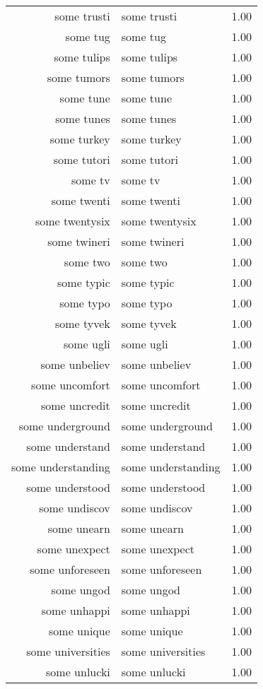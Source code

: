 \begin{table}[ht]
\begin{tabular}{rlr}
  some trusti & some trusti & 1.00 \\ 
  some tug & some tug & 1.00 \\ 
  some tulips & some tulips & 1.00 \\ 
  some tumors & some tumors & 1.00 \\ 
  some tune & some tune & 1.00 \\ 
  some tunes & some tunes & 1.00 \\ 
  some turkey & some turkey & 1.00 \\ 
  some tutori & some tutori & 1.00 \\ 
  some tv & some tv & 1.00 \\ 
  some twenti & some twenti & 1.00 \\ 
  some twentysix & some twentysix & 1.00 \\ 
  some twineri & some twineri & 1.00 \\ 
  some two & some two & 1.00 \\ 
  some typic & some typic & 1.00 \\ 
  some typo & some typo & 1.00 \\ 
  some tyvek & some tyvek & 1.00 \\ 
  some ugli & some ugli & 1.00 \\ 
  some unbeliev & some unbeliev & 1.00 \\ 
  some uncomfort & some uncomfort & 1.00 \\ 
  some uncredit & some uncredit & 1.00 \\ 
  some underground & some underground & 1.00 \\ 
  some understand & some understand & 1.00 \\ 
  some understanding & some understanding & 1.00 \\ 
  some understood & some understood & 1.00 \\ 
  some undiscov & some undiscov & 1.00 \\ 
  some unearn & some unearn & 1.00 \\ 
  some unexpect & some unexpect & 1.00 \\ 
  some unforeseen & some unforeseen & 1.00 \\ 
  some ungod & some ungod & 1.00 \\ 
  some unhappi & some unhappi & 1.00 \\ 
  some unique & some unique & 1.00 \\ 
  some universities & some universities & 1.00 \\ 
  some unlucki & some unlucki & 1.00 \\ 

\end{tabular}
\end{table}
